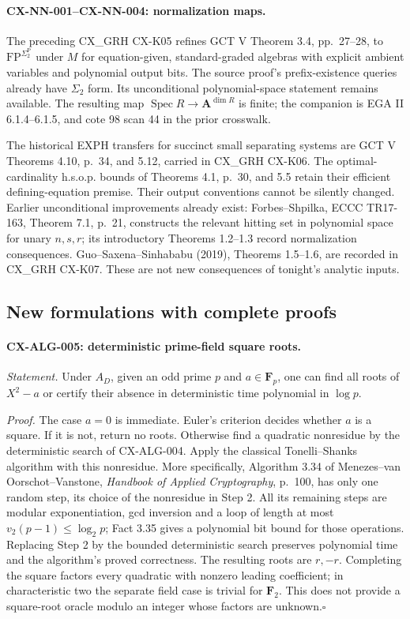 \documentclass[11pt,a4paper]{article}
\begin{document}
\paragraph{CX-NN-001--CX-NN-004: normalization maps.}
The preceding CX\_GRH CX-K05 refines GCT V Theorem 3.4, pp.~27--28, to
$\mathrm{FP}^{\Sigma_2^{\mathrm P}}$ under $M$ for equation-given,
standard-graded algebras with explicit ambient variables and polynomial
output bits. The source proof's prefix-existence queries already have
$\Sigma_2$ form. Its unconditional polynomial-space statement remains
available. The resulting map
$\operatorname{Spec}R\to\mathbf A^{\dim R}$ is finite; the companion is
EGA II 6.1.4--6.1.5, and cote 98 scan 44 in the prior crosswalk.

The historical EXPH transfers for succinct small separating systems are
GCT V Theorems 4.10, p.~34, and 5.12, carried in CX\_GRH CX-K06. The
optimal-cardinality h.s.o.p. bounds of Theorems 4.1, p.~30, and 5.5 retain
their efficient defining-equation premise. Their output conventions cannot
be silently changed. Earlier unconditional improvements already exist:
Forbes--Shpilka, ECCC TR17-163, Theorem 7.1, p.~21, constructs the relevant
hitting set in polynomial space for unary $n,s,r$; its introductory
Theorems 1.2--1.3 record normalization consequences. Guo--Saxena--Sinhababu
(2019), Theorems 1.5--1.6, are recorded in CX\_GRH CX-K07. These are not
new consequences of tonight's analytic inputs.

\subsection{New formulations with complete proofs}

\paragraph{CX-ALG-005: deterministic prime-field square roots.}
\emph{Statement.} Under $A_D$, given an odd prime $p$ and $a\in\mathbf F_p$,
one can find all roots of $X^2-a$ or certify their absence in deterministic
time polynomial in $\log p$.

\emph{Proof.} The case $a=0$ is immediate. Euler's criterion decides whether
$a$ is a square. If it is not, return no roots. Otherwise find a quadratic
nonresidue by the deterministic search of CX-ALG-004. Apply the classical
Tonelli--Shanks algorithm with this nonresidue. More specifically, Algorithm
3.34 of Menezes--van Oorschot--Vanstone, \emph{Handbook of Applied Cryptography},
p.~100, has only one random step, its choice of the nonresidue in Step 2.
All its remaining steps are modular exponentiation, gcd inversion and a
loop of length at most $v_2(p-1)\leq\log_2p$; Fact 3.35 gives a polynomial
bit bound for those operations. Replacing Step 2 by the bounded deterministic
search preserves polynomial time and the algorithm's proved correctness.
The resulting roots are $r,-r$. Completing the square factors every quadratic
with nonzero leading coefficient; in characteristic two the separate field
case is trivial for $\mathbf F_2$. This does not provide a square-root oracle
modulo an integer whose factors are unknown.\hfill$\square$
\end{document}
